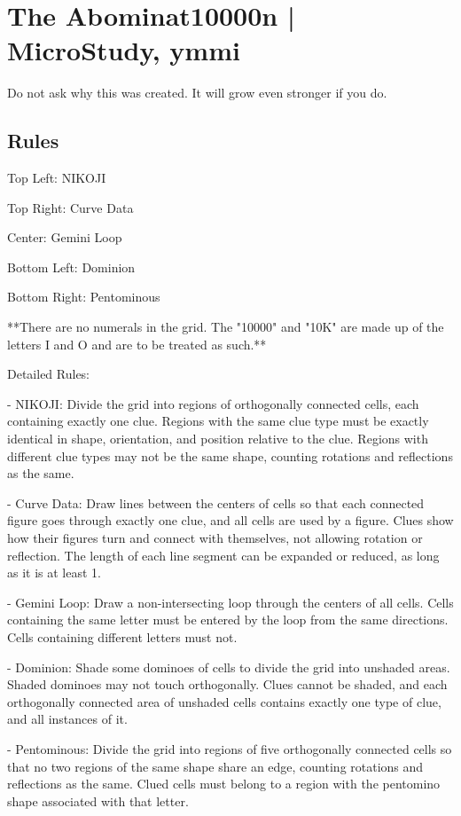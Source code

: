 \section[The Abominat10000n | MicroStudy, ymmi {[\emph{Nikoji, Curve Data, Gemini Loop, Dominion, Pentominous}]}]{The Abominat10000n | {\normalfont MicroStudy, ymmi}}
\label{sec:42-the-abominat10000n-microstudy-ymmi}
Do not ask why this was created. It will grow even stronger if you do.
\subsection*{Rules}
\begin{markdown}
Top Left: NIKOJI

Top Right: Curve Data

Center: Gemini Loop

Bottom Left: Dominion

Bottom Right: Pentominous



**There are no numerals in the grid. The "10000" and "10K" are made up of the letters I and O and are to be treated as such.**



Detailed Rules:

- NIKOJI: Divide the grid into regions of orthogonally connected cells, each containing exactly one clue. Regions with the same clue type must be exactly identical in shape, orientation, and position relative to the clue. Regions with different clue types may not be the same shape, counting rotations and reflections as the same.

- Curve Data: Draw lines between the centers of cells so that each connected figure goes through exactly one clue, and all cells are used by a figure. Clues show how their figures turn and connect with themselves, not allowing rotation or reflection. The length of each line segment can be expanded or reduced, as long as it is at least 1.

- Gemini Loop: Draw a non-intersecting loop through the centers of all cells. Cells containing the same letter must be entered by the loop from the same directions. Cells containing different letters must not.

- Dominion: Shade some dominoes of cells to divide the grid into unshaded areas. Shaded dominoes may not touch orthogonally. Clues cannot be shaded, and each orthogonally connected area of unshaded cells contains exactly one type of clue, and all instances of it.

- Pentominous: Divide the grid into regions of five orthogonally connected cells so that no two regions of the same shape share an edge, counting rotations and reflections as the same. Clued cells must belong to a region with the pentomino shape associated with that letter.
\end{markdown}
